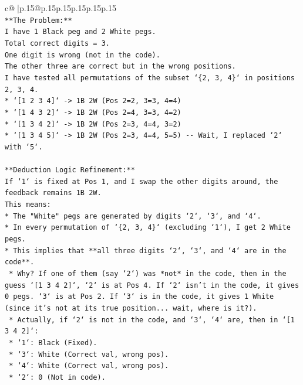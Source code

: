 \documentclass{article}
\begin{document}
{\begin{supertabular}{c@{$\;$}|p{.15\linewidth}@{}p{.15\linewidth}p{.15\linewidth}p{.15\linewidth}p{.15\linewidth}p{.15\linewidth}}
{{{\\ 
\texttt{**The Problem:**} \\
\texttt{I have 1 Black peg and 2 White pegs.} \\
\texttt{Total correct digits = 3.} \\
\texttt{One digit is wrong (not in the code).} \\
\texttt{The other three are correct but in the wrong positions.} \\
\texttt{I have tested all permutations of the subset `\{2, 3, 4\}` in positions 2, 3, 4.} \\
\texttt{*   `{[}1 2 3 4{]}` {-}> 1B 2W (Pos 2=2, 3=3, 4=4)} \\
\texttt{*   `{[}1 4 3 2{]}` {-}> 1B 2W (Pos 2=4, 3=3, 4=2)} \\
\texttt{*   `{[}1 3 4 2{]}` {-}> 1B 2W (Pos 2=3, 4=4, 3=2)} \\
\texttt{*   `{[}1 3 4 5{]}` {-}> 1B 2W (Pos 2=3, 4=4, 5=5) {-}{-} Wait, I replaced `2` with `5`.} \\
\\ 
\texttt{**Deduction Logic Refinement:**} \\
\texttt{If `1` is fixed at Pos 1, and I swap the other digits around, the feedback remains 1B 2W.} \\
\texttt{This means:} \\
\texttt{*   The "White" pegs are generated by digits `2`, `3`, and `4`.} \\
\texttt{*   In every permutation of `\{2, 3, 4\}` (excluding `1`), I get 2 White pegs.} \\
\texttt{*   This implies that **all three digits `2`, `3`, and `4` are in the code**.} \\
\texttt{    *   Why? If one of them (say `2`) was *not* in the code, then in the guess `{[}1 3 4 2{]}`, `2` is at Pos 4. If `2` isn't in the code, it gives 0 pegs. `3` is at Pos 2. If `3` is in the code, it gives 1 White (since it's not at its true position... wait, where is it?).} \\
\texttt{    *   Actually, if `2` is not in the code, and `3`, `4` are, then in `{[}1 3 4 2{]}`:} \\
\texttt{        *   `1`: Black (Fixed).} \\
\texttt{        *   `3`: White (Correct val, wrong pos).} \\
\texttt{        *   `4`: White (Correct val, wrong pos).} \\
\texttt{        *   `2`: 0 (Not in code).} \\
}}}
\end{supertabular}}
\end{document}
